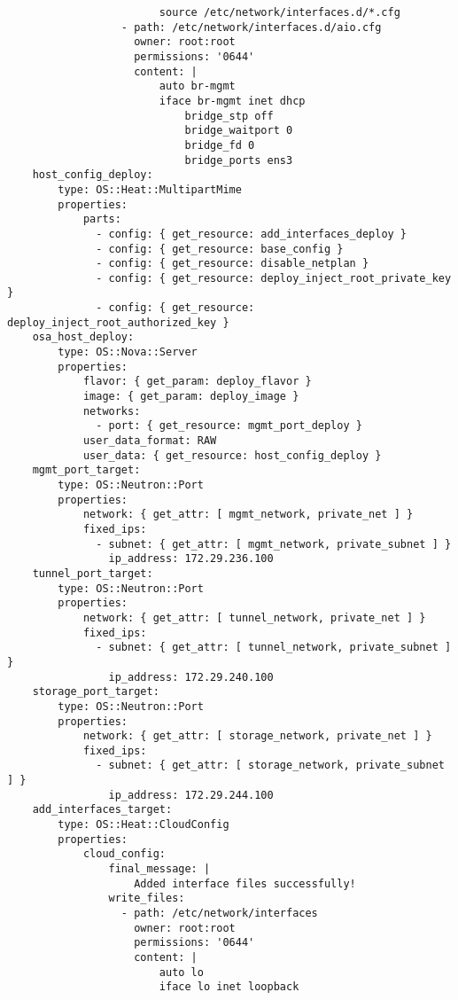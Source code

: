 \begin{verbatim}
                        source /etc/network/interfaces.d/*.cfg
                  - path: /etc/network/interfaces.d/aio.cfg
                    owner: root:root
                    permissions: '0644'
                    content: |
                        auto br-mgmt
                        iface br-mgmt inet dhcp
                            bridge_stp off
                            bridge_waitport 0
                            bridge_fd 0
                            bridge_ports ens3
    host_config_deploy:
        type: OS::Heat::MultipartMime
        properties:
            parts:
              - config: { get_resource: add_interfaces_deploy }
              - config: { get_resource: base_config }
              - config: { get_resource: disable_netplan }
              - config: { get_resource: deploy_inject_root_private_key }
              - config: { get_resource: deploy_inject_root_authorized_key }
    osa_host_deploy:
        type: OS::Nova::Server
        properties:
            flavor: { get_param: deploy_flavor }
            image: { get_param: deploy_image }
            networks:
              - port: { get_resource: mgmt_port_deploy }
            user_data_format: RAW
            user_data: { get_resource: host_config_deploy }
    mgmt_port_target:
        type: OS::Neutron::Port
        properties:
            network: { get_attr: [ mgmt_network, private_net ] }
            fixed_ips:
              - subnet: { get_attr: [ mgmt_network, private_subnet ] }
                ip_address: 172.29.236.100
    tunnel_port_target:
        type: OS::Neutron::Port
        properties:
            network: { get_attr: [ tunnel_network, private_net ] }
            fixed_ips:
              - subnet: { get_attr: [ tunnel_network, private_subnet ] }
                ip_address: 172.29.240.100
    storage_port_target:
        type: OS::Neutron::Port
        properties:
            network: { get_attr: [ storage_network, private_net ] }
            fixed_ips:
              - subnet: { get_attr: [ storage_network, private_subnet ] }
                ip_address: 172.29.244.100
    add_interfaces_target:
        type: OS::Heat::CloudConfig
        properties:
            cloud_config:
                final_message: |
                    Added interface files successfully!
                write_files:
                  - path: /etc/network/interfaces
                    owner: root:root
                    permissions: '0644'
                    content: |
                        auto lo
                        iface lo inet loopback


\end{verbatim}
